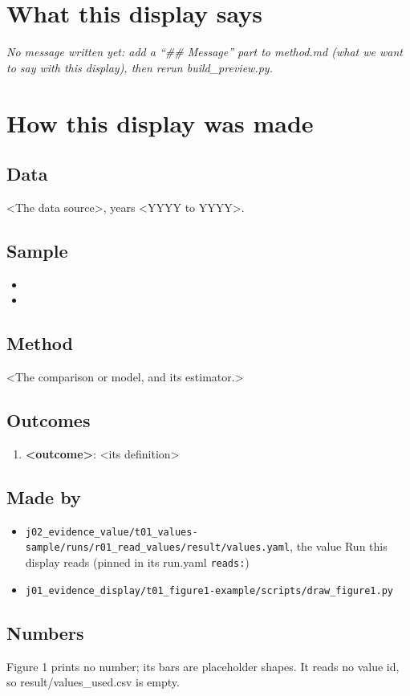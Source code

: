 \documentclass[12pt]{article}
\begin{document}
\makeatletter\renewcommand{\fps@figure}{H}\renewcommand{\fps@table}{H}\makeatother
\renewcommand{\figurename}{Figure}\renewcommand{\tablename}{Table}\renewcommand{\thefigure}{1}\renewcommand{\thetable}{1}
{}
\clearpage
\section*{What this display says}
\emph{No message written yet: add a ``\#\# Message'' part to method.md (what we want to say with this display), then rerun build\_preview.py.}
\section*{How this display was made}
\subsection*{Data}
<The data source>, years <YYYY to YYYY>.

\subsection*{Sample}
\begin{itemize}\item <who is in it>
\item <how they were chosen>
\end{itemize}
\subsection*{Method}
<The comparison or model, and its estimator.>

\subsection*{Outcomes}
\begin{enumerate}\item \textbf{<outcome>}: <its definition>
\end{enumerate}
\subsection*{Made by}
\begin{itemize}\item \texttt{j02\_evidence\_value/t01\_values-sample/runs/r01\_read\_values/result/values.yaml}, the value Run this display reads (pinned in its run.yaml \texttt{reads:})
\item \texttt{j01\_evidence\_display/t01\_figure1-example/scripts/draw\_figure1.py}
\end{itemize}
\subsection*{Numbers}
Figure 1 prints no number; its bars are placeholder shapes. It reads no value id, so result/values\_used.csv is empty.
\end{document}
